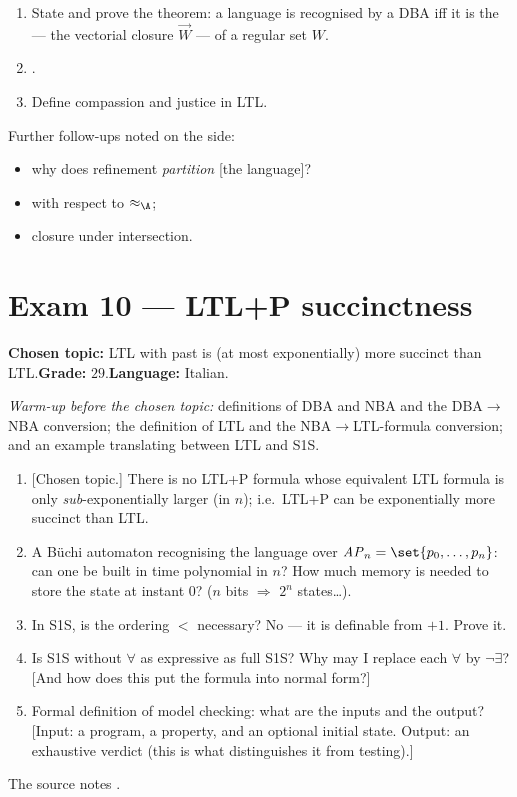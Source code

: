 \documentclass[oneside]{academica}
\begin{document}
\begin{enumerate}
  \item State and prove the theorem: a language is recognised by a DBA
    iff it is the  --- the vectorial closure
    $\overrightarrow{W}$ --- of a regular set $W$.
  \item {}.
  \item Define compassion and justice in LTL.
\end{enumerate}
Further follow-ups noted on the side:
\begin{itemize}
  \item why does refinement \emph{partition} [the language]?
  \item with respect to $\approx_{\A}$;
  \item closure under intersection.
\end{itemize}

\section{Exam 10 --- LTL+P succinctness}
\textbf{Chosen topic:} LTL with past is (at most exponentially) more
succinct than LTL.\quad\textbf{Grade:} $29$.\quad\textbf{Language:}
Italian.

\medskip
\textit{Warm-up before the chosen topic:} definitions of DBA and NBA and
the DBA$\to$NBA conversion; the definition of LTL and the
NBA$\to$LTL-formula conversion; and an example translating between LTL
and S1S.

\begin{enumerate}
  \item {}[Chosen topic.] There is no LTL+P formula whose equivalent LTL
    formula is only \emph{sub}-exponentially larger (in $n$); i.e.\ LTL+P
    can be exponentially more succinct than LTL.
  \item A Büchi automaton recognising the language over $\mathit{AP}_n =
    \set{p_0,\dots,p_n}$: can one be built in time polynomial in $n$? How
    much memory is needed to store the state at instant $0$? ($n$ bits
    $\Rightarrow$ $2^n$ states\ldots).
  \item In S1S, is the ordering $<$ necessary? No --- it is definable
    from $+1$. Prove it.
  \item Is S1S without $\forall$ as expressive as full S1S? Why may I
    replace each $\forall$ by $\neg\exists$? [And how does this put the
    formula into normal form?]
  \item Formal definition of model checking: what are the inputs and the
    output? [Input: a program, a property, and an optional initial
    state. Output: an exhaustive verdict (this is what distinguishes it
    from testing).]
\end{enumerate}
\begin{note}
  The source notes .
\end{note}
\end{document}
